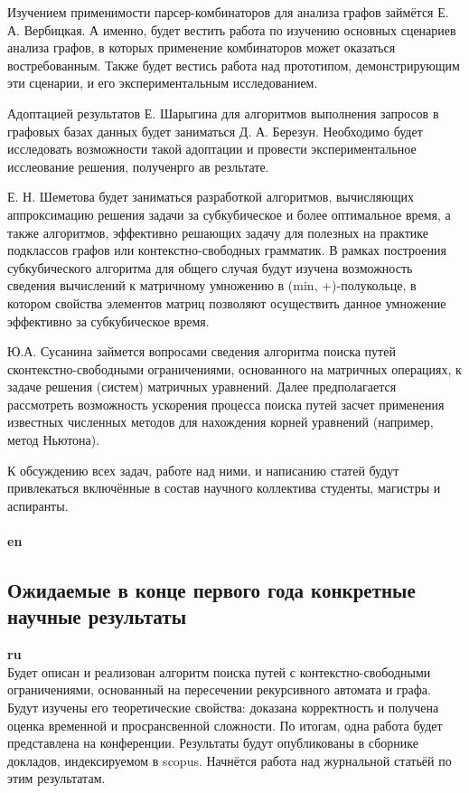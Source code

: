 \documentclass[12pt]{article}  %
\theoremstyle{remark}
\begin{document}
Изучением применимости парсер-комбинаторов для анализа графов займётся Е. А. Вербицкая.
А именно, будет вестить работа по изучению основных сценариев анализа графов, в которых применение комбинаторов может оказаться востребованным.
Также будет вестись работа над прототипом, демонстрирующим эти сценарии, и его экспериментальным исследованием.

Адоптацией результатов Е. Шарыгина для алгоритмов выполнения запросов в графовых базах данных будет заниматься Д. А. Березун.
Необходимо будет исследовать возможности такой адоптации и провести экспериментальное исслеование решения, полученрго ав резльтате.

Е. Н. Шеметова будет заниматься разработкой алгоритмов, вычисляющих аппроксимацию решения задачи за субкубическое и более оптимальное время, а также алгоритмов, эффективно решающих задачу для полезных на практике подклассов графов или контекстно-свободных грамматик. В рамках построения субкубического алгоритма для общего случая будут изучена возможность сведения вычислений к матричному умножению в (min, +)-полукольце, в котором свойства элементов матриц позволяют осуществить данное умножение эффективно за субкубическое время.

Ю.А. Сусанина займется вопросами сведения алгоритма поиска путей сконтекстно-свободными ограничениями, основанного на матричных операциях, к задаче решения (систем) матричных уравнений.
Далее предполагается рассмотреть возможность ускорения процесса поиска путей засчет применения известных численных методов для нахождения корней уравнений (например, метод Ньютона). 

К обсуждению всех задач, работе над ними, и написанию статей будут привлекаться включённые в состав научного коллектива студенты, магистры и аспиранты.
\\
\\
\textbf{en}\\



\subsection{Ожидаемые в конце первого года конкретные научные результаты}

\textbf{ru}\\
%
Будет описан и реализован алгоритм поиска путей с контекстно-свободными ограничениями, основанный на пересечении рекурсивного автомата и графа. Будут изучены его теоретические свойства: доказана корректность и получена оценка временной и просрансвенной сложности.
По итогам, одна работа будет представлена на конференции. Результаты будут опубликованы в сборнике докладов, индексируемом в scopus.
Начнётся работа над журнальной статьёй по этим результатам.
\end{document}
